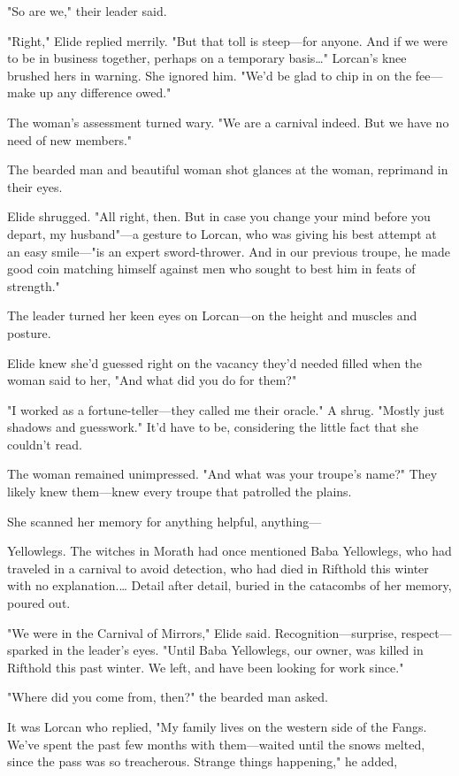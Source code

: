 "So are we," their leader said.

"Right," Elide replied merrily.
"But that toll is steep---for anyone.
And if we were to be in business together, perhaps on a temporary basis\ldots" Lorcan's knee brushed hers in warning.
She ignored him.
"We'd be glad to chip in on the fee--- make up any difference owed."

The woman's assessment turned wary.
"We are a carnival indeed.
But we have no need of new members."

The bearded man and beautiful woman shot glances at the woman, reprimand in their eyes.

Elide shrugged.
"All right, then.
But in case you change your mind before you depart, my husband"---a gesture to Lorcan, who was giving his best attempt at an easy smile---"is an expert sword-thrower.
And in our previous troupe, he made good coin matching himself against men who sought to best him in feats of strength."

The leader turned her keen eyes on Lorcan---on the height and muscles and posture.

Elide knew she'd guessed right on the vacancy they'd needed filled when the woman said to her, "And what did you do for them?"

"I worked as a fortune-teller---they called me their oracle."
A shrug.
"Mostly just shadows and guesswork."
It'd have to be, considering the little fact that she couldn't read.

The woman remained unimpressed.
"And what was your troupe's name?"
They likely knew them---knew every troupe that patrolled the plains.

She scanned her memory for anything helpful, anything---

Yellowlegs.
The witches in Morath had once mentioned Baba Yellowlegs, who had traveled in a carnival to avoid detection, who had died in Rifthold this winter with no explanation.\ldots{} Detail after detail, buried in the catacombs of her memory, poured out.

"We were in the Carnival of Mirrors," Elide said.
Recognition---surprise, respect---sparked in the leader's eyes.
"Until Baba Yellowlegs, our owner, was killed in Rifthold this past winter.
We left, and have been looking for work since."

"Where did you come from, then?"
the bearded man asked.

It was Lorcan who replied, "My family lives on the western side of the Fangs.
We've spent the past few months with them---waited until the snows melted, since the pass was so treacherous.
Strange things happening," he added,

